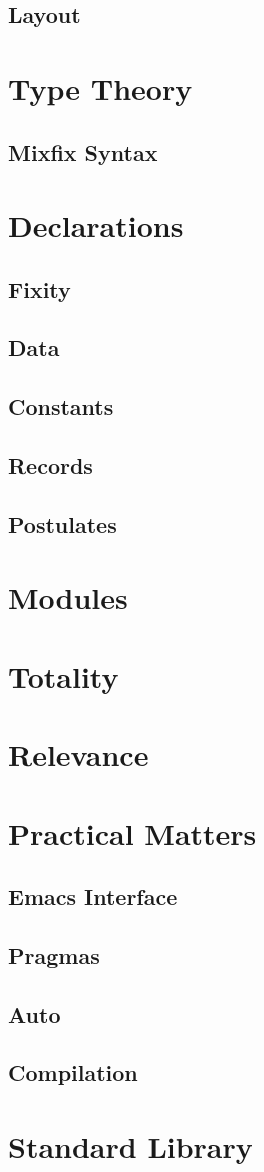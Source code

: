 \documentclass{article}
\begin{document}
\subsection{Layout}
\label{sec:layout}
\section{Type Theory}
\subsection{Mixfix Syntax}
\section{Declarations}
\subsection{Fixity}
\subsection{Data}
\subsection{Constants}
\subsection{Records}
\subsection{Postulates}
\section{Modules}
\label{sec:modules}
\section{Totality}
\section{Relevance}
\section{Practical Matters}
\subsection{Emacs Interface}
\subsection{Pragmas}
\subsection{Auto}
\subsection{Compilation}
\section{Standard Library}
\end{document}
